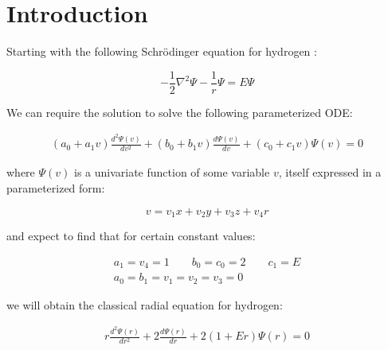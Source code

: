 \documentclass{article}
\theoremstyle{definition}
\theoremstyle{plain}
\begin{document}
\section{Introduction}

Starting with the following Schr\"odinger equation for hydrogen \cite{pauling and wilson}:

\begin{equation}
\label{schrodinger hydrogen}
-\frac{1}{2}\nabla^2 \Psi - \frac{1}{r}\Psi = E \Psi
\end{equation}

We can require the solution to solve the following parameterized ODE:

\begin{equation}
\begin{gathered}
(a_0 + a_1 v) \frac{d^2\Psi(v)}{dv^2} + (b_0 + b_1 v) \frac{d\Psi(v)}{dv} + (c_0 + c_1 v) \Psi(v) = 0
\end{gathered}
\label{ansatz 1a}
\end{equation}

where $\Psi(v)$ is a univariate function of some variable $v$, itself expressed in a parameterized form:

\begin{equation}
v = v_1 x + v_2 y + v_3 z + v_4 r
\label{ansatz 1b}
\end{equation}

and expect to find that for certain constant values:

\begin{equation}
\begin{gathered}
a_1 = v_4 = 1 \qquad
b_0 = c_0 = 2 \qquad
c_1 = E \\
a_0 = b_1 = v_1 = v_2 = v_3 = 0
\end{gathered}
\label{ansatz 1sol}
\end{equation}

we will obtain the classical radial equation for hydrogen:

\begin{equation}
\begin{gathered}
r \frac{d^2\Psi(r)}{dr^2} + 2 \frac{d\Psi(r)}{dr} + 2(1 + E r) \Psi(r) = 0
\end{gathered}
\end{equation}
\end{document}
